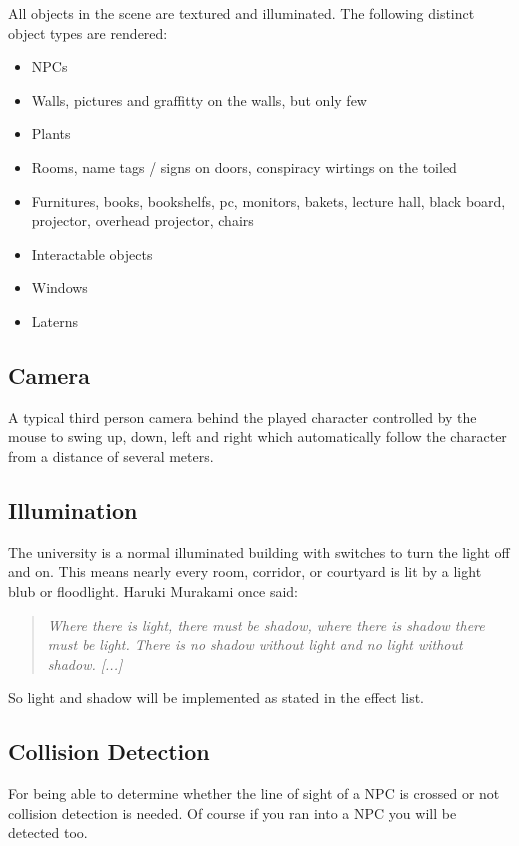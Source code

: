 \documentclass[12pt]{article}
\begin{document}
All objects in the scene are textured and illuminated. The following distinct object types are rendered:
\begin{itemize}
	\item NPCs
	\item Walls, pictures and graffitty on the walls, but only few
	\item Plants
	\item Rooms, name tags / signs on doors, conspiracy wirtings on the toiled
	\item Furnitures, books, bookshelfs, pc, monitors, bakets, lecture hall, black board, projector, overhead projector, chairs
	\item Interactable objects
	\item Windows
	\item Laterns
\end{itemize}

\subsection*{Camera}
A typical third person camera behind the played character controlled by the mouse to swing up, down, left and right which automatically follow the character from a distance of several meters.

\subsection*{Illumination}
The university is a normal illuminated building with switches to turn the light off and on. This means nearly every room, corridor, or courtyard is lit by a light blub or floodlight. Haruki Murakami once said:

\begin{quote}
\textit{Where there is light, there must be shadow, where there is shadow there must be light. There is no shadow without light and no light without shadow. [...]}
\end{quote}

So light and shadow will be implemented as stated in the effect list.

\subsection*{Collision Detection}
For being able to determine whether the line of sight of a NPC is crossed or not collision detection is needed. Of course if you ran into a NPC you will be detected too.
\end{document}
